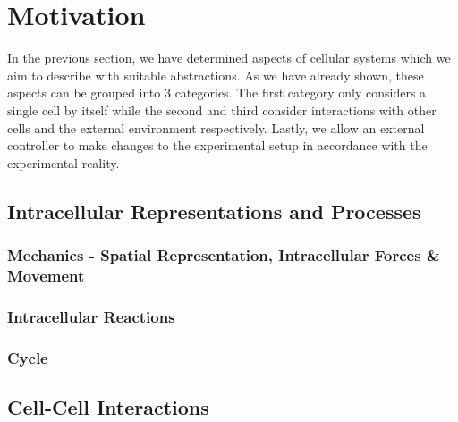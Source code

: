 \documentclass{article}
\begin{document}
\section{Motivation}
\label{subsec:motivation}
In the previous section, we have determined aspects of cellular systems which we aim to describe
with suitable abstractions.
As we have already shown, these aspects can be grouped into 3 categories.
The first category only considers a single cell by itself while the second and third consider
interactions with other cells and the external environment respectively.
Lastly, we allow an external controller to make changes to the experimental setup in accordance with
the experimental reality.

\subsection{Intracellular Representations and Processes}
\label{subsec:abstractions-cell}
\subsubsection{Mechanics - Spatial Representation, Intracellular Forces \& Movement}
\label{subsubsec:abstractions-cell-mechanics}
\subsubsection{Intracellular Reactions}
\label{subsubsec:abstractions-cell-reactions}
\subsubsection{Cycle}
\label{subsubsec:abstractions-cell-cycle}

\subsection{Cell-Cell Interactions}
\label{subsec:abstractions-cell-cell}
\end{document}
